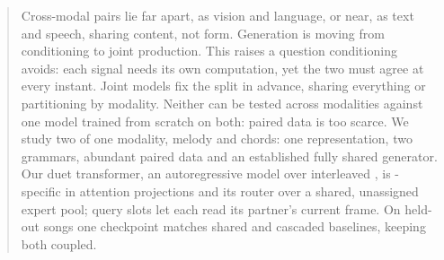 \begin{abstract}
Cross-modal pairs lie far apart, as vision and language, or near, as
text and speech, sharing content, not form. Generation is moving from
conditioning to joint production. This raises a question conditioning
avoids: each signal needs its own computation, yet the two must agree
at every instant. Joint models fix the split in advance, sharing
everything or partitioning by modality. Neither can be tested across
modalities against one model trained from scratch on both: paired
data is too scarce. We study two \strms{} of one modality, melody and
chords: one representation, two grammars, abundant paired data and an
established fully shared generator. Our duet transformer, an
autoregressive model over interleaved \strms{}, is \strm{}-specific in
attention projections and its router over a shared, unassigned expert
pool; query slots let each \strm{} read its partner's current frame.
On held-out songs one checkpoint matches shared and cascaded
baselines, keeping both \strms{} coupled.
\end{abstract}
